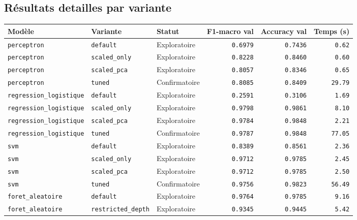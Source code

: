 \subsection{Résultats detailles par variante}

\begin{table}[H]
\centering
\begin{tabular}{|l|l|l|r|r|r|}
\hline
\textbf{Modèle} & \textbf{Variante} & \textbf{Statut} & \textbf{F1-macro val} & \textbf{Accuracy val} & \textbf{Temps (s)} \\
\hline
\texttt{perceptron} & \texttt{default} & Exploratoire & \texttt{0.6979} & \texttt{0.7436} & \texttt{0.62} \\
\texttt{perceptron} & \texttt{scaled\_only} & Exploratoire & \texttt{0.8228} & \texttt{0.8460} & \texttt{0.60} \\
\texttt{perceptron} & \texttt{scaled\_pca} & Exploratoire & \texttt{0.8057} & \texttt{0.8346} & \texttt{0.65} \\
\texttt{perceptron} & \texttt{tuned} & Confirmatoire & \texttt{0.8085} & \texttt{0.8409} & \texttt{29.79} \\
\texttt{regression\_logistique} & \texttt{default} & Exploratoire & \texttt{0.2591} & \texttt{0.3106} & \texttt{1.69} \\
\texttt{regression\_logistique} & \texttt{scaled\_only} & Exploratoire & \texttt{0.9798} & \texttt{0.9861} & \texttt{8.10} \\
\texttt{regression\_logistique} & \texttt{scaled\_pca} & Exploratoire & \texttt{0.9784} & \texttt{0.9848} & \texttt{2.21} \\
\texttt{regression\_logistique} & \texttt{tuned} & Confirmatoire & \texttt{0.9787} & \texttt{0.9848} & \texttt{77.05} \\
\texttt{svm} & \texttt{default} & Exploratoire & \texttt{0.8389} & \texttt{0.8561} & \texttt{2.36} \\
\texttt{svm} & \texttt{scaled\_only} & Exploratoire & \texttt{0.9712} & \texttt{0.9785} & \texttt{2.45} \\
\texttt{svm} & \texttt{scaled\_pca} & Exploratoire & \texttt{0.9712} & \texttt{0.9785} & \texttt{2.50} \\
\texttt{svm} & \texttt{tuned} & Confirmatoire & \texttt{0.9756} & \texttt{0.9823} & \texttt{56.49} \\
\texttt{foret\_aleatoire} & \texttt{default} & Exploratoire & \texttt{0.9764} & \texttt{0.9785} & \texttt{9.16} \\
\texttt{foret\_aleatoire} & \texttt{restricted\_depth} & Exploratoire & \texttt{0.9345} & \texttt{0.9445} & \texttt{5.42} \\

\end{tabular}
\end{table}
